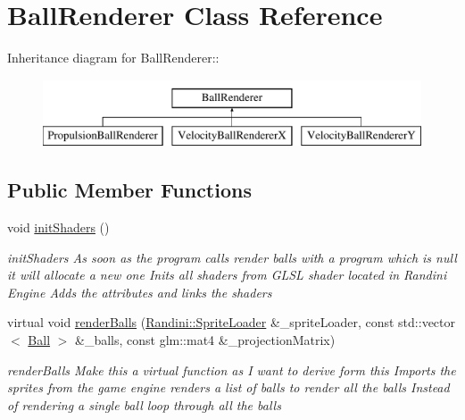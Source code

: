 \hypertarget{classBallRenderer}{
\section{BallRenderer Class Reference}
\label{classBallRenderer}
}
Inheritance diagram for BallRenderer::\begin{figure}[H]
\begin{center}
\leavevmode
\includegraphics[height=2cm]{classBallRenderer}
\end{center}
\end{figure}
\subsection*{Public Member Functions}
\begin{DoxyCompactItemize}
\item 
\hypertarget{classBallRenderer_a6340a67dc1f573c71ea9934f35560256}{
void \hyperlink{classBallRenderer_a6340a67dc1f573c71ea9934f35560256}{initShaders} ()}
\label{classBallRenderer_a6340a67dc1f573c71ea9934f35560256}

\begin{DoxyCompactList}\small\item\em initShaders As soon as the program calls render balls with a program which is null it will allocate a new one Inits all shaders from GLSL shader located in Randini Engine Adds the attributes and links the shaders \item\end{DoxyCompactList}\item 
virtual void \hyperlink{classBallRenderer_a11d6402983ed53ab7f3d3353244110da}{renderBalls} (\hyperlink{classRandini_1_1SpriteLoader}{Randini::SpriteLoader} \&\_\-spriteLoader, const std::vector$<$ \hyperlink{structBall}{Ball} $>$ \&\_\-balls, const glm::mat4 \&\_\-projectionMatrix)
\begin{DoxyCompactList}\small\item\em renderBalls Make this a virtual function as I want to derive form this Imports the sprites from the game engine renders a list of balls to render all the balls Instead of rendering a single ball loop through all the balls \item\end{DoxyCompactList}\end{DoxyCompactItemize}
